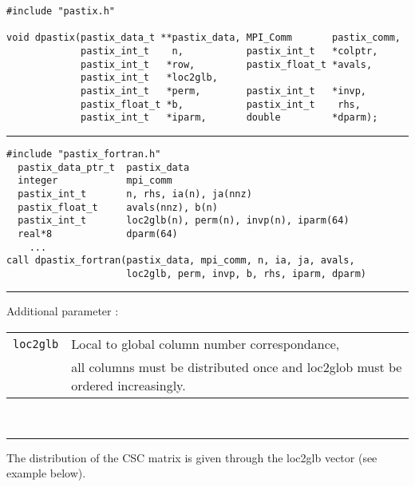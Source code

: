 \documentclass{article}
\newcommand\pastix{\textsc{PaStiX}}
\newenvironment{tabI}{\begin{tabular}{p{30mm}p{96mm}}}{\end{tabular}}
\begin{document}
\begin{multicols}{2}
  \begin{lstlisting}
#include "pastix.h"

void dpastix(pastix_data_t **pastix_data, MPI_Comm       pastix_comm, 
             pastix_int_t    n,           pastix_int_t   *colptr, 
             pastix_int_t   *row,         pastix_float_t *avals, 
             pastix_int_t   *loc2glb,    
             pastix_int_t   *perm,        pastix_int_t   *invp,        
             pastix_float_t *b,           pastix_int_t    rhs,         
             pastix_int_t   *iparm,       double         *dparm);
  \end{lstlisting}

  \hrule
  \lstset{language=Fortran}
  \begin{lstlisting}
#include "pastix_fortran.h"
  pastix_data_ptr_t  pastix_data
  integer            mpi_comm
  pastix_int_t       n, rhs, ia(n), ja(nnz)
  pastix_float_t     avals(nnz), b(n)
  pastix_int_t       loc2glb(n), perm(n), invp(n), iparm(64)
  real*8             dparm(64)    
    ...
call dpastix_fortran(pastix_data, mpi_comm, n, ia, ja, avals,
                     loc2glb, perm, invp, b, rhs, iparm, dparm) 
  \end{lstlisting}
  \hrule
  
  Additional parameter :

  \begin{tabI}
    \texttt{loc2glb} & Local to global column number correspondance,\\
                     & all columns must be distributed once and loc2glob must be ordered increasingly.\\
  \end{tabI}\\
  \hrule

  The distribution of the CSC matrix is given through the loc2glb vector (see example below).


\end{multicols}
\end{document}
